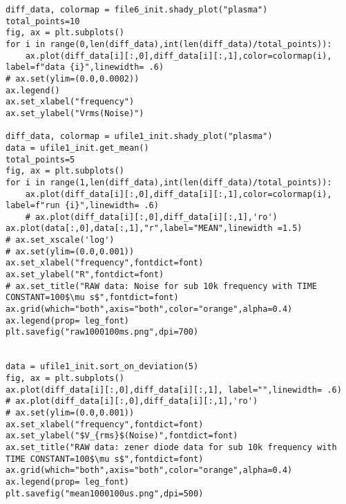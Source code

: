 \begin{verbatim}
diff_data, colormap = file6_init.shady_plot("plasma")
total_points=10
fig, ax = plt.subplots()
for i in range(0,len(diff_data),int(len(diff_data)/total_points)):
    ax.plot(diff_data[i][:,0],diff_data[i][:,1],color=colormap(i), label=f"data {i}",linewidth= .6)
# ax.set(ylim=(0.0,0.0002))
ax.legend()
ax.set_xlabel("frequency")
ax.set_ylabel("Vrms(Noise)")

diff_data, colormap = ufile1_init.shady_plot("plasma")
data = ufile1_init.get_mean()
total_points=5
fig, ax = plt.subplots()
for i in range(1,len(diff_data),int(len(diff_data)/total_points)):
    ax.plot(diff_data[i][:,0],diff_data[i][:,1],color=colormap(i), label=f"run {i}",linewidth= .6)
    # ax.plot(diff_data[i][:,0],diff_data[i][:,1],'ro')
ax.plot(data[:,0],data[:,1],"r",label="MEAN",linewidth =1.5)
# ax.set_xscale('log')
# ax.set(ylim=(0.0,0.001))
ax.set_xlabel("frequency",fontdict=font)
ax.set_ylabel("R",fontdict=font)
# ax.set_title("RAW data: Noise for sub 10k frequency with TIME CONSTANT=100$\mu s$",fontdict=font)
ax.grid(which="both",axis="both",color="orange",alpha=0.4)
ax.legend(prop= leg_font)
plt.savefig("raw1000100ms.png",dpi=700)


data = ufile1_init.sort_on_deviation(5)
fig, ax = plt.subplots()
ax.plot(diff_data[i][:,0],diff_data[i][:,1], label="",linewidth= .6)
# ax.plot(diff_data[i][:,0],diff_data[i][:,1],'ro')
# ax.set(ylim=(0.0,0.001))
ax.set_xlabel("frequency",fontdict=font)
ax.set_ylabel("$V_{rms}$(Noise)",fontdict=font)
ax.set_title("RAW data: zener diode data for sub 10k frequency with TIME CONSTANT=100$\mu s$",fontdict=font)
ax.grid(which="both",axis="both",color="orange",alpha=0.4)
ax.legend(prop= leg_font)
plt.savefig("mean1000100us.png",dpi=500)



\end{verbatim}
